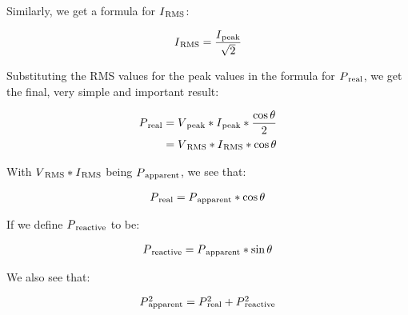 \documentclass[a4paper]{article}
\def\SB#1{\textsubscript{{#1}}}
\def\SPSB#1#2{\rlap{\textsuperscript{#1}}\SB{#2}}
\begin{document}
Similarly, we get a formula for $I\SB{RMS}$:

\begin{align*}
  I\SB{RMS} &= \frac{I\SB{peak}}{\sqrt{2}}\\
\end{align*}

Substituting the RMS values for the peak values in the formula for
$P\SB{real}$, we get the final, very simple and important result:

\begin{align*}
  P\SB{real} &= V\SB{peak} * I\SB{peak} * \frac{\cos{\theta}}{2}\\
  &= V\SB{RMS} * I\SB{RMS} * \cos{\theta} \\
\end{align*}

With $V\SB{RMS} * I\SB{RMS}$ being $P\SB{apparent}$, we  see that:

\begin{align*}
  P\SB{real} &= P\SB{apparent} * \cos{\theta} \\
\end{align*}

If we define $P\SB{reactive}$ to be:

\begin{align*}
  P\SB{reactive} &= P\SB{apparent} * \sin{\theta} \\
\end{align*}

We also see that:

\begin{align*}
  P\SPSB{2}{apparent} &= P\SPSB{2}{real} + P\SPSB{2}{reactive} \\
\end{align*}
\end{document}
